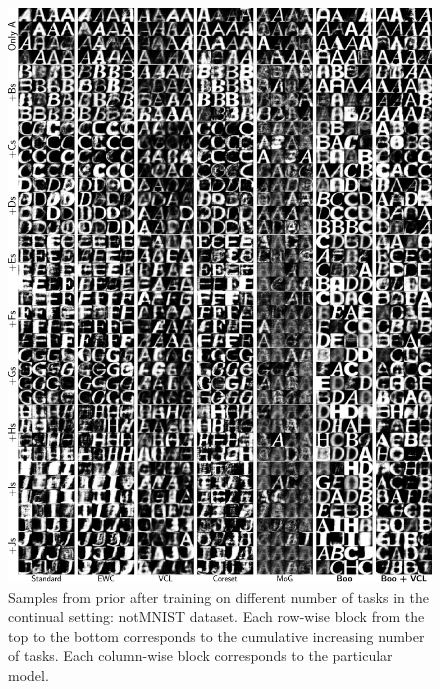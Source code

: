 \begin{figure}[ht]
		\centering
		\includegraphics[width=\textwidth]{pics/1_boovae/notMNIST_full.pdf}
		\caption{Samples from prior after training on different number of tasks  in the continual setting: notMNIST dataset. Each row-wise block from the top to the bottom corresponds to the cumulative increasing number of tasks. Each column-wise block corresponds to the particular model.}
		\label{fig:notMNIST_gen}
\end{figure}

